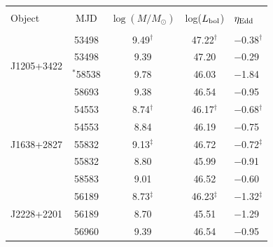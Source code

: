 \documentclass[fleqn,usenatbib]{mnras}
\begin{document}
\begin{table}
  \centering
  \begin{tabular}{l c cc l}
    \hline
    \hline
                      &                 &                                     &                               & \\
Object            & MJD          &  $\log (M/M_{\odot})$  & log($L_{\rm bol}$)    &  $\eta_{\rm Edd}$  \\
                      &                 &                                     &                               & \\
    \hline
\multirow{4}{*}{J1205+3422} & 53498          &   9.49$^{\dagger }$   &   47.22$^{\dagger }$  & $-$0.38$^{\dagger }$   \\
                                             &  53498        &   9.39                       &   47.20                      & $-$0.29   \\
                                             & $^{*}$58538  &   9.78                       &  46.03                      & $-$1.84 \\  
                                             & 58693            &  9.38                       &  46.54                      &  $-$0.95  \\                    
    \hline
\multirow{5}{*}{J1638+2827} & 54553            & 8.74$^{\dagger }$     &  46.17$^{\dagger }$   & $-$0.68$^{\dagger }$  \\
                                              & 54553            & 8.84                        &   46.19    & $-$0.75  \\
                                             & 55832           & 9.13$^{\ddagger }$  &    46.72    & $-$0.72$^{\ddagger }$  \\      
                                             & 55832          & 8.80                         &   45.99    & $-$0.91 \\     
                                             & 58583           & 9.01                        &    46.52    & $-$0.60   \\
    \hline
\multirow{4}{*}{ J2228+2201} & 56189         & 8.73$^{\ddagger }$ & 46.23$^{\ddagger }$  &  $-$1.32$^{\ddagger }$ \\
                                              &  56189      & 8.70                       & 45.51                        &  $-$1.29 \\
                                              & 56960         &  9.39                      &  46.54                        & $-$0.95  \\      

\end{tabular}
\end{table}
\end{document}
